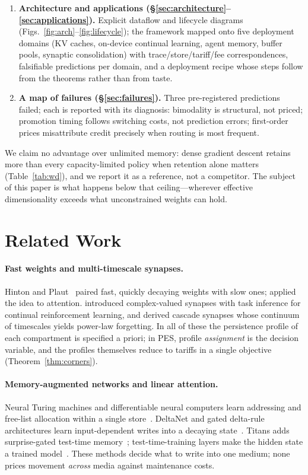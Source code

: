 \documentclass[10pt,twocolumn]{article}
\theoremstyle{definition}
\newcommand{\PES}{PES}
\begin{document}
\begin{enumerate}
\item \textbf{Architecture and applications (\S\ref{sec:architecture}--\ref{sec:applications}).} Explicit
dataflow and lifecycle diagrams (Figs.~\ref{fig:arch}--\ref{fig:lifecycle}); the framework mapped onto five
deployment domains ({KV} caches, on-device continual learning, agent memory, buffer pools, synaptic
consolidation) with trace/store/tariff/fee correspondences, falsifiable predictions per domain, and a
deployment recipe whose steps follow from the theorems rather than from taste.
\item \textbf{A map of failures (\S\ref{sec:failures}).} Three pre-registered predictions failed; each is
reported with its diagnosis: bimodality is structural, not priced; promotion timing follows switching costs,
not prediction errors; first-order prices misattribute credit precisely when routing is most frequent.
\end{enumerate}

We claim no advantage over unlimited memory: dense gradient descent retains more than every capacity-limited
policy when retention alone matters (Table~\ref{tab:wd}), and we report it as a reference, not a competitor.
The subject of this paper is what happens below that ceiling---wherever effective dimensionality exceeds what
unconstrained weights can hold.
\section{Related Work}\label{sec:related}

\paragraph{Fast weights and multi-timescale synapses.}
Hinton and Plaut~\citep{hinton1987fast} paired fast, quickly decaying weights with slow ones;
\citet{ba2016using} applied the idea to attention. \citet{kaplanis2018complex} introduced complex-valued
synapses with task inference for continual reinforcement learning, and \citet{benna2016synaptic} derived
cascade synapses whose continuum of timescales yields power-law forgetting. In all of these the persistence
profile of each compartment is specified a priori; in \PES{}, profile \emph{assignment} is the decision
variable, and the profiles themselves reduce to tariffs in a single objective (Theorem~\ref{thm:corners}).

\paragraph{Memory-augmented networks and linear attention.}
Neural Turing machines and differentiable neural computers learn addressing and free-list allocation within
a single store~\citep{graves2014neural,graves2016hybrid}. DeltaNet and gated delta-rule architectures learn
input-dependent writes into a decaying state~\citep{schlag2021linear,yang2024gated}. Titans adds
surprise-gated test-time memory~\citep{behrouz2024titans}; test-time-training layers make the hidden state a
trained model~\citep{sun2024testtime}. These methods decide what to write into one medium; none prices
movement \emph{across} media against maintenance costs.
\end{document}
